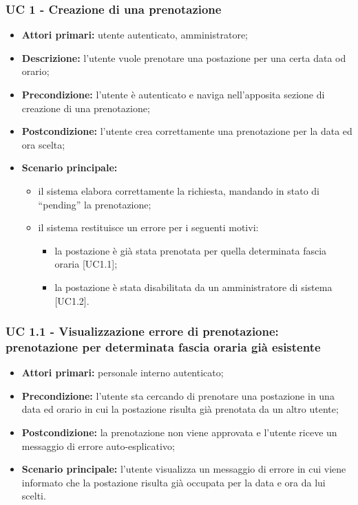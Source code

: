 \subsubsection{UC 1 - Creazione di una prenotazione}

\begin{itemize}
\item \textbf{Attori primari:} utente autenticato, amministratore;
\item \textbf{Descrizione:} l’utente vuole prenotare una postazione per una certa data od orario;
\item \textbf{Precondizione:} l’utente è autenticato e naviga nell’apposita sezione di creazione di una prenotazione;
\item \textbf{Postcondizione:} l’utente crea correttamente una prenotazione per la data ed ora scelta;
\item \textbf{Scenario principale:} 
	\begin{itemize}
		\item il sistema elabora correttamente la richiesta, mandando in stato di “pending” la prenotazione;
		\item il sistema restituisce un errore per i seguenti motivi:
		\begin{itemize}
			\item la postazione è già stata prenotata per quella determinata fascia oraria [UC1.1];
			\item la postazione è stata disabilitata da un amministratore di sistema [UC1.2].	
		\end{itemize}
	\end{itemize}
\end{itemize}

\subsubsection{UC 1.1 - Visualizzazione errore di prenotazione: prenotazione per determinata fascia oraria già esistente}
\begin{itemize}
\item \textbf{Attori primari:} personale interno autenticato;
\item \textbf{Precondizione:} l'utente sta cercando di prenotare una postazione in una data ed orario in cui la postazione risulta già prenotata da un altro utente;
\item \textbf{Postcondizione:} la prenotazione non viene approvata e l'utente riceve un messaggio di errore auto-esplicativo;
\item \textbf{Scenario principale:} l'utente visualizza un messaggio di errore in cui viene informato che la postazione risulta già occupata per la data e ora da lui scelti.
\end{itemize}

